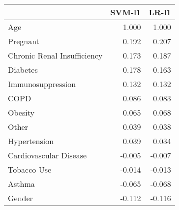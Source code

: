 \begin{tabular}{lrr}
\toprule
{} &  SVM-l1 &  LR-l1 \\
\midrule
Age                         &   1.000 &  1.000 \\
Pregnant                    &   0.192 &  0.207 \\
Chronic Renal Insufficiency &   0.173 &  0.187 \\
Diabetes                    &   0.178 &  0.163 \\
Immunosuppression           &   0.132 &  0.132 \\
COPD                        &   0.086 &  0.083 \\
Obesity                     &   0.065 &  0.068 \\
Other                       &   0.039 &  0.038 \\
Hypertension                &   0.039 &  0.034 \\
Cardiovascular Disease      &  -0.005 & -0.007 \\
Tobacco Use                 &  -0.014 & -0.013 \\
Asthma                      &  -0.065 & -0.068 \\
Gender                      &  -0.112 & -0.116 \\
\bottomrule
\end{tabular}
